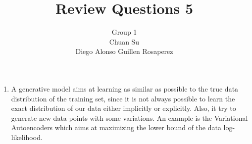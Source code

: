 \documentclass[12pt]{article}
\begin{document}
\title{Review Questions 5}
\author{Group 1 \\ Chuan Su \\ Diego Alonso Guillen Rosaperez}

\maketitle
\begin{enumerate}
\item A generative model aims at learning as similar as possible to the true data distribution of the training set, since it is not always possible to learn the exact distribution of our data either implicitly or explicitly. Also, it try to generate new data points with some variations. An example is the Variational Autoencoders which aims at maximizing the lower bound of the data log-likelihood.


\end{enumerate}
\end{document}
